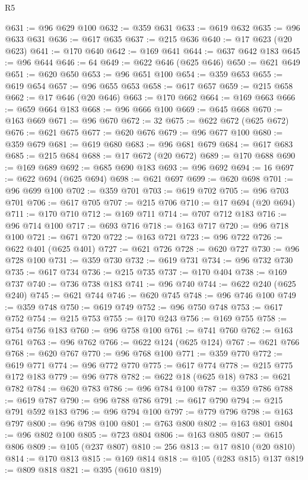 \begin{lexlean}{R5}
\begin{coremodule}
@631 := @96 @629 @100
@632 := @359 @631
@633 := @619 @632
@635 := @96 @633 @631
@636 := @617 @635
@637 := @215 @636
@640 := @17 @623 (@20 @623)
@641 := @170 @640
@642 := @169 @641
@644 := @637 @642 @183
@645 := @96 @644
@646 := 64
@649 := @622 @646 (@625 @646)
@650 := @621 @649
@651 := @620 @650
@653 := @96 @651 @100
@654 := @359 @653
@655 := @619 @654
@657 := @96 @655 @653
@658 := @617 @657
@659 := @215 @658
@662 := @17 @646 (@20 @646)
@663 := @170 @662
@664 := @169 @663
@666 := @659 @664 @183
@668 := @96 @666 @100
@669 := @645 @668
@670 := @163 @669
@671 := @96 @670
@672 := 32
@675 := @622 @672 (@625 @672)
@676 := @621 @675
@677 := @620 @676
@679 := @96 @677 @100
@680 := @359 @679
@681 := @619 @680
@683 := @96 @681 @679
@684 := @617 @683
@685 := @215 @684
@688 := @17 @672 (@20 @672)
@689 := @170 @688
@690 := @169 @689
@692 := @685 @690 @183
@693 := @96 @692
@694 := 16
@697 := @622 @694 (@625 @694)
@698 := @621 @697
@699 := @620 @698
@701 := @96 @699 @100
@702 := @359 @701
@703 := @619 @702
@705 := @96 @703 @701
@706 := @617 @705
@707 := @215 @706
@710 := @17 @694 (@20 @694)
@711 := @170 @710
@712 := @169 @711
@714 := @707 @712 @183
@716 := @96 @714 @100
@717 := @693 @716
@718 := @163 @717
@720 := @96 @718 @100
@721 := @671 @720
@722 := @163 @721
@723 := @96 @722
@726 := @622 @401 (@625 @401)
@727 := @621 @726
@728 := @620 @727
@730 := @96 @728 @100
@731 := @359 @730
@732 := @619 @731
@734 := @96 @732 @730
@735 := @617 @734
@736 := @215 @735
@737 := @170 @404
@738 := @169 @737
@740 := @736 @738 @183
@741 := @96 @740
@744 := @622 @240 (@625 @240)
@745 := @621 @744
@746 := @620 @745
@748 := @96 @746 @100
@749 := @359 @748
@750 := @619 @749
@752 := @96 @750 @748
@753 := @617 @752
@754 := @215 @753
@755 := @170 @243
@756 := @169 @755
@758 := @754 @756 @183
@760 := @96 @758 @100
@761 := @741 @760
@762 := @163 @761
@763 := @96 @762
@766 := @622 @124 (@625 @124)
@767 := @621 @766
@768 := @620 @767
@770 := @96 @768 @100
@771 := @359 @770
@772 := @619 @771
@774 := @96 @772 @770
@775 := @617 @774
@778 := @215 @775 @172 @183
@779 := @96 @778
@782 := @622 @18 (@625 @18)
@783 := @621 @782
@784 := @620 @783
@786 := @96 @784 @100
@787 := @359 @786
@788 := @619 @787
@790 := @96 @788 @786
@791 := @617 @790
@794 := @215 @791 @592 @183
@796 := @96 @794 @100
@797 := @779 @796
@798 := @163 @797
@800 := @96 @798 @100
@801 := @763 @800
@802 := @163 @801
@804 := @96 @802 @100
@805 := @723 @804
@806 := @163 @805
@807 := @615 @806
@809 := @105 (@237 @807)
@810 := 256
@813 := @17 @810 (@20 @810)
@814 := @170 @813
@815 := @169 @814
@818 := @105 (@283 @815) @137
@819 := @809 @818
@821 := @395 (@610 @819)

\end{coremodule}
\end{lexlean}
